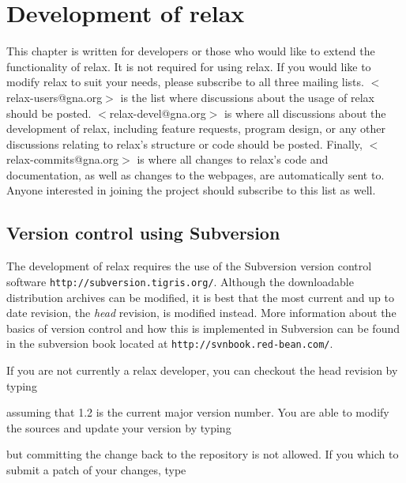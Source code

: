 
\chapter{Development of relax}

This chapter is written for developers or those who would like to extend the functionality of relax.  It is not required for using relax.  If you would like to modify relax to suit your needs, please subscribe to all three mailing lists.  $<$relax-users@gna.org$>$ is the list where discussions about the usage of relax should be posted.  $<$relax-devel@gna.org$>$ is where all discussions about the development of relax, including feature requests, program design, or any other discussions relating to relax's structure or code should be posted.  Finally, $<$relax-commits@gna.org$>$ is where all changes to relax's code and documentation, as well as changes to the webpages, are automatically sent to.  Anyone interested in joining the project should subscribe to this list as well.




\section{Version control using Subversion}

The development of relax requires the use of the Subversion version control software \texttt{http://subversion.tigris.org/}.  Although the downloadable distribution archives can be modified, it is best that the most current and up to date revision, the \textit{head} revision, is modified instead.  More information about the basics of version control and how this is implemented in Subversion can be found in the subversion book located at \texttt{http://svnbook.red-bean.com/}.

If you are not currently a relax developer, you can checkout the head revision by typing


assuming that 1.2 is the current major version number.  You are able to modify the sources and update your version by typing


but committing the change back to the repository is not allowed.  If you which to submit a patch of your changes, type

